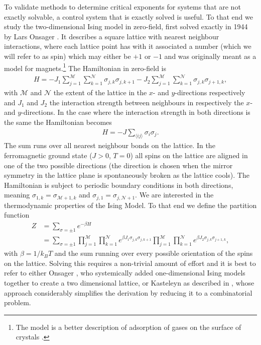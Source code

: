 \documentclass[11pt, a4paper]{report} %
\begin{document}
To validate methods to determine critical exponents for systems that are not exactly solvable, a control system that is exactly solved is useful. To that end we study the two-dimensional Ising model in zero-field, first solved exactly in 1944 by Lars Onsager \cite{onsager:1944}.
It describes a square lattice with nearest neighbour interactions, where each lattice point has with it associated a number (which we will refer to as spin) which may either be \(+1\) or \(-1\) and was originally meant as a model for magnets.\footnote{The model is a better description of adsorption of gases on the surface of crystals \cite{onsager:1944}.}
The Hamiltonian in zero-field is \cite{mccoy:1973}
\begin{align}
	H = -J_{1} \sum_{j=1}^{\mathcal{M}} \sum_{k=1}^{\mathcal{N}} \sigma_{j,k} \sigma_{j,k+1} - J_{2} \sum_{j=1}^{\mathcal{M}} \sum_{k=1}^{\mathcal{N}} \sigma_{j,k} \sigma_{j+1,k},
\end{align}
with \(\mathcal{M}\) and \(\mathcal{N}\) the extent of the lattice in the \(x\)- and \(y\)-directions respectively and \(J_{1}\) and \(J_{2}\) the interaction strength between neighbours in respectively the \(x\)- and \(y\)-directions.
In the case where the interaction strength in both directions is the same the Hamiltonian becomes \cite{newman:1999}
\begin{align}
	\label{eq:isotropic_Hamiltonian}
	H = -J \sum_{\langle ij \rangle} \sigma_{i} \sigma_{j}.
\end{align}
The sum runs over all nearest neighbour bonds on the lattice.
In the ferromagnetic ground state (\(J>0\), \(T=0\)) all spins on the lattice are aligned in one of the two possible directions (the direction is chosen when the mirror symmetry in the lattice plane is spontaneously broken as the lattice cools).
The Hamiltonian is subject to periodic boundary conditions in both directions, meaning \(\sigma_{1,k} = \sigma_{\mathcal{M}+1,k}\) and \(\sigma_{j,1} = \sigma_{j,\mathcal{N}+1}\).
We are interested in the thermodynamic properties of the Ising Model.
To that end we define the partition function
\begin{align}
	Z &= \sum_{\sigma = \pm 1} e^{-\beta H} \\
	  &= \sum_{\sigma = \pm 1} \prod_{j=1}^{\mathcal{M}} \prod_{k=1}^{\mathcal{N}} e^{\beta J_1 \sigma_{j,k} \sigma_{j,k+1}} \prod_{j=1}^{\mathcal{M}} \prod_{k=1}^{\mathcal{N}} e^{\beta J_2 \sigma_{j,k} \sigma_{j+1,k}},
\end{align}
with \(\beta=1/k_B T\) and the sum running over every possible orientation of the spins on the lattice. Solving this requires a non-trivial amount of effort and it is best to refer to either Onsager \cite{onsager:1944}, who systemically added one-dimensional Ising models together to create a two dimensional lattice, or Kasteleyn as described in \cite{mccoy:1973}, whose approach considerably simplifies the derivation by reducing it to a combinatorial problem.
\end{document}
